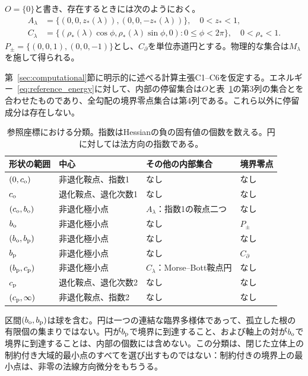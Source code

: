 $O=\{0\}$と書き、存在するときには次のようにおく。
\begin{align}
 A_\lambda&=\{(0,0,z_*(\lambda)),(0,0,-z_*(\lambda))\},\quad 0<z_*<1,\label{eq:axial_set}\\
 C_\lambda&=\{(\rho_*(\lambda)\cos\phi,\rho_*(\lambda)\sin\phi,0):0\le\phi<2\pi\},\quad 0<\rho_*<1.\label{eq:circle_set}
\end{align}
$P_\pm=\{(0,0,1),(0,0,-1)\}$とし、$C_\partial$を単位赤道円とする。物理的な集合は$M_\lambda$を施して得られる。

\begin{theorem}\label{thm:classification}
第~\ref{sec:computational}節に明示的に述べる計算主張C1--C6を仮定する。エネルギー~\eqref{eq:reference_energy}に対して、内部の停留集合は$O$と表~\ref{tab:classification}の第3列の集合とを合わせたものであり、全勾配の境界零点集合は第4列である。これら以外に停留成分は存在しない。
\end{theorem}

\begin{table}[htbp]\centering\small
\caption{参照座標における分類。指数はHessianの負の固有値の個数を数える。円に対しては法方向の指数である。}\label{tab:classification}
\begin{tabularx}{\linewidth}{@{}lXXX@{}}\toprule
形状の範囲 & 中心 & その他の内部集合 & 境界零点\\\midrule
$(0,c_{\mathrm o})$ & 非退化鞍点、\mbox{指数1} & なし & なし\\
$c_{\mathrm o}$ & 退化鞍点、退化次数1 & なし & なし\\
$(c_{\mathrm o},b_{\mathrm o})$ & 非退化極小点 & $A_\lambda$：指数1の鞍点二つ & なし\\
$b_{\mathrm o}$ & 非退化極小点 & なし & $P_\pm$\\
$(b_{\mathrm o},b_{\mathrm p})$ & 非退化極小点 & なし & なし\\
$b_{\mathrm p}$ & 非退化極小点 & なし & $C_\partial$\\
$(b_{\mathrm p},c_{\mathrm p})$ & 非退化極小点 & $C_\lambda$：Morse--Bott鞍点円 & なし\\
$c_{\mathrm p}$ & 退化鞍点、退化次数2 & なし & なし\\
$(c_{\mathrm p},\infty)$ & 非退化鞍点、\mbox{指数2} & なし & なし\\\bottomrule
\end{tabularx}
\end{table}

区間$(b_{\mathrm o},b_{\mathrm p})$は球を含む。円は一つの連結な臨界多様体であって、孤立した根の有限個の集まりではない。円が$b_{\mathrm p}$で境界に到達すること、および軸上の対が$b_{\mathrm o}$で境界に到達することは、内部の個数には含めない。この分類は、閉じた立体上の制約付き大域的最小点のすべてを選び出すものではない：制約付きの境界上の最小点は、非零の法線方向微分をもちうる。

